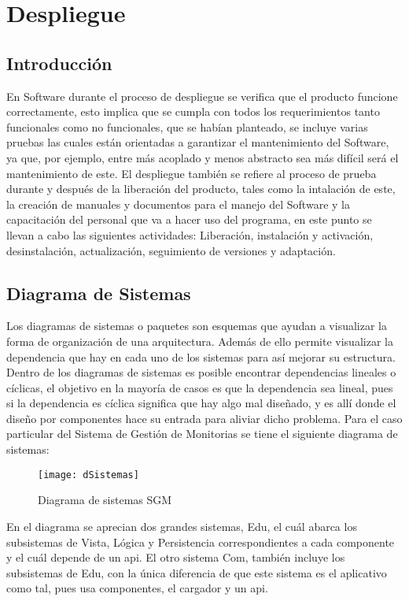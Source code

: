
\chapter{Despliegue}

\section{Introducción}
En Software durante el proceso de despliegue se verifica que el producto funcione correctamente, esto implica que se cumpla con todos los requerimientos tanto funcionales como no funcionales, que se habían planteado, se incluye varias pruebas las cuales están orientadas a garantizar el mantenimiento del Software, ya que, por ejemplo, entre más acoplado y menos abstracto sea más difícil será el mantenimiento de este. El despliegue también se refiere al proceso de prueba durante y después de la liberación del producto, tales como la intalación de este, la creación de manuales y documentos para el manejo del Software y la capacitación del personal que va a hacer uso del programa, en este punto se llevan a cabo las siguientes actividades: Liberación, instalación y activación, desinstalación, actualización, seguimiento de versiones y adaptación\cite{Ospina_2012}.
\newpage

\section{Diagrama de Sistemas}

Los diagramas de sistemas o paquetes son esquemas que ayudan a visualizar la forma de organización de una arquitectura. Además de ello permite visualizar la dependencia que hay en cada uno de los sistemas para así mejorar su estructura. Dentro de los diagramas de sistemas es posible encontrar dependencias lineales o cíclicas, el objetivo en la mayoría de casos es que la dependencia sea lineal, pues si la dependencia es cíclica significa que hay algo mal diseñado, y es allí donde el diseño por componentes hace su entrada para aliviar dicho problema. 
Para el caso particular del Sistema de Gestión de Monitorias se tiene el siguiente diagrama de sistemas:

\begin{figure}[H]
	\centering
	\texttt{[image: dSistemas]}
	\centering
	\caption{Diagrama de sistemas SGM}
	\label{fig:dSistemas}
\end{figure}

En el diagrama se aprecian dos grandes sistemas, Edu, el cuál abarca los subsistemas de Vista, Lógica y Persistencia correspondientes a cada componente y el cuál depende de un api. El otro sistema Com, también incluye los subsistemas de Edu, con la única diferencia de que este sistema es el aplicativo como tal, pues usa componentes, el cargador y un api.

